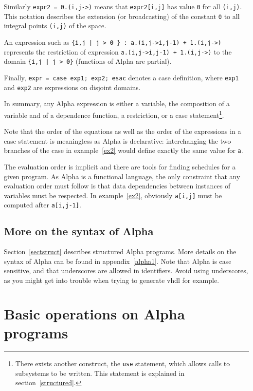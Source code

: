 \documentclass[12pt]{article}
\newcommand{\Alpha}{{\sc Alpha}}
\newcommand{\vhdl}{{\sc vhdl}}
\newcommand{\alfa}{\Alpha}
\begin{document}
Similarly {\tt expr2 = 0.(i,j->)} means that {\tt expr2[i,j]} has
value \texttt{0} for all \texttt{(i,j)}. This notation describes
the extension (or broadcasting) of the constant \texttt{0} to 
all integral points \texttt{(i,j)} of the space.

An expression such as \texttt{\{i,j | j > 0 \} : a.(i,j->i,j-1) + 1.(i,j->)}
represents the restriction of expression
\texttt{a.(i,j->i,j-1) + 1.(i,j->)} to the 
domain \texttt{\{i,j | j > 0\}} (functions of \alfa{} are
partial).

Finally, \texttt{expr = case exp1; exp2; esac} denotes 
a case definition, where \texttt{exp1} and \texttt{exp2} are
expressions on disjoint domains.

In summary, any \alfa{} expression is either a variable, 
the composition of a variable and of a dependence function, 
a restriction, or a case statement\footnote{There exists another
construct, the \texttt{use} statement, which allows calls
to subsystems to be written. This statement is explained in 
section~\ref{structured}.}.

Note that the order of the equations as well as the order of the
expressions in a case statement is meaningless
as \alfa{} is declarative:
interchanging the two branches of the case in
example~\ref{ex2} would define exactly the same value for {\tt a}.

The
evaluation order is implicit and there are tools for finding schedules
for a given program. As {\Alpha} is a functional language, the only
constraint that any evaluation order must follow is that data
dependencies between instances of 
variables must be respected. In example~\ref{ex2},
obviously {\tt a[i,j]} must be computed after {\tt a[i,j-1]}.

\subsection{More on the syntax of \alfa{}}
Section~\ref{sectstruct} describes structured \alfa{} programs.
More details on the syntax of \alfa{} can be found in
appendix~\ref{alpha1}. 
Note that \alfa{} is case sensitive, and that 
underscores are allowed in identifiers. Avoid using 
underscores, as you might get into trouble when trying to 
generate \vhdl{} for example.

\section{Basic operations on {\Alpha} programs}
\label{basic}
\end{document}
